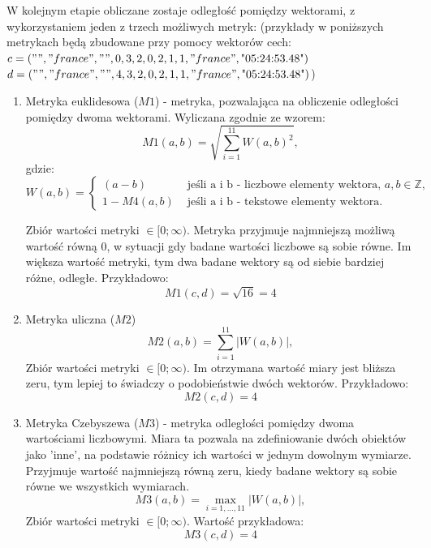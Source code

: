 \documentclass{classrep}
\begin{document}
W kolejnym etapie obliczane zostaje odległość pomiędzy wektorami, z wykorzystaniem
jeden z trzech możliwych metryk: 
(przykłady w poniższych metrykach będą zbudowane przy pomocy wektorów cech: \\
 $c = ("", "france", "", 0, 3, 2, 0, 2, 1, 1, "france", \text{"05:24:53.48"})$ \\
 $d = ("", "france", "", 4, 3, 2, 0, 2, 1, 1, "france", \text{"05:24:53.48"})$)

\begin{enumerate}
  \item Metryka euklidesowa ($M1$) -  metryka, pozwalająca na obliczenie odległości pomiędzy dwoma wektorami. Wyliczana zgodnie ze wzorem:
  \begin{equation}
    M1(a,b) = \sqrt{\sum_{i=1}^{11} W(a, b)^2},
  \end{equation} 
  gdzie:
  \begin{equation}
    W(a, b) = 
    \begin{cases}
      (a - b)   & \text{ jeśli a i b - liczbowe elementy wektora, } a,b \in \mathbb{Z},\\
      1- M4(a, b) & \text{ jeśli a i b - tekstowe elementy wektora.} 
    \end{cases}
  \end{equation}

  Zbiór wartości metryki $\in [0; \infty) $.
  Metryka przyjmuje najmniejszą możliwą wartość równą 0, w sytuacji gdy badane wartości liczbowe są sobie równe.
  Im większa wartość metryki, tym dwa badane wektory są od siebie bardziej różne, odległe. Przykładowo:
  \begin{equation}
    M1(c, d) = \sqrt{16} = 4
  \end{equation}
  \item Metryka uliczna ($M2$)
  \begin{equation}
    M2(a, b) = \sum_{i=1}^{11} |W(a,b)|, 
  \end{equation}
   Zbiór wartości metryki $\in [0; \infty) $.
  Im otrzymana wartość miary jest bliższa zeru, tym lepiej to świadczy o podobieństwie dwóch wektorów. Przykładowo:
  \begin{equation}
    M2(c, d) = 4
  \end{equation}
  \item Metryka Czebyszewa ($M3$) - metryka odległości pomiędzy dwoma wartościami liczbowymi. Miara ta pozwala na zdefiniowanie dwóch obiektów jako 'inne', na podstawie różnicy ich wartości w jednym dowolnym wymiarze.
  Przyjmuje wartość najmniejszą równą zeru, kiedy badane wektory są sobie równe we wszystkich wymiarach.
  \begin{equation}
    M3(a, b) = \max_{i=1, ..., 11} |W(a,b)|, 
  \end{equation}
  Zbiór wartości metryki $\in [0; \infty) $. Wartość przykładowa:
  \begin{equation}
    M3(c, d) = 4
  \end{equation}


\end{enumerate}
\end{document}
